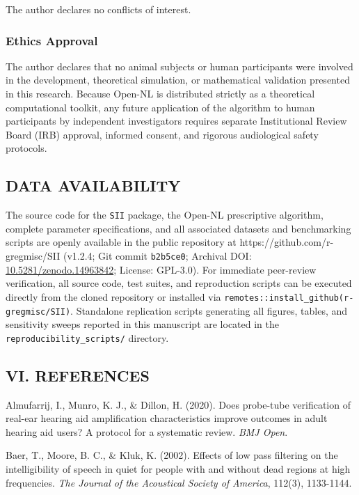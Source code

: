 \documentclass[
  12pt,
]{article}
\begin{document}
The author declares no conflicts of interest.

\subsubsection{Ethics Approval}\label{ethics-approval}

The author declares that no animal subjects or human participants were
involved in the development, theoretical simulation, or mathematical
validation presented in this research. Because Open-NL is distributed
strictly as a theoretical computational toolkit, any future application
of the algorithm to human participants by independent investigators
requires separate Institutional Review Board (IRB) approval, informed
consent, and rigorous audiological safety protocols.

\subsection{DATA AVAILABILITY}\label{data-availability}

The source code for the \texttt{SII} package, the Open-NL prescriptive
algorithm, complete parameter specifications, and all associated
datasets and benchmarking scripts are openly available in the public
repository at https://github.com/r-gregmisc/SII (v1.2.4; Git commit
\texttt{b2b5ce0}; Archival DOI:
\href{https://doi.org/10.5281/zenodo.14963842}{10.5281/zenodo.14963842};
License: GPL-3.0). For immediate peer-review verification, all source
code, test suites, and reproduction scripts can be executed directly
from the cloned repository or installed via
\texttt{remotes::install\_github(\textquotesingle{}r-gregmisc/SII\textquotesingle{})}.
Standalone replication scripts generating all figures, tables, and
sensitivity sweeps reported in this manuscript are located in the
\texttt{reproducibility\_scripts/} directory.

\subsection{VI. REFERENCES}\label{vi.-references}

Almufarrij, I., Munro, K. J., \& Dillon, H. (2020). Does probe-tube
verification of real-ear hearing aid amplification characteristics
improve outcomes in adult hearing aid users? A protocol for a systematic
review. \emph{BMJ Open}.

Baer, T., Moore, B. C., \& Kluk, K. (2002). Effects of low pass
filtering on the intelligibility of speech in quiet for people with and
without dead regions at high frequencies. \emph{The Journal of the
Acoustical Society of America}, 112(3), 1133-1144.
\end{document}
